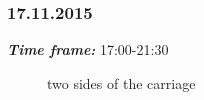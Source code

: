 \subsubsection{17.11.2015}
\textit{\textbf{Time frame:}} 17:00-21:30 \newline


\begin{figure}[H]
	\begin{minipage}[h]{1\linewidth}
		\caption{two sides of the carriage}
	\end{minipage}
\end{figure}

